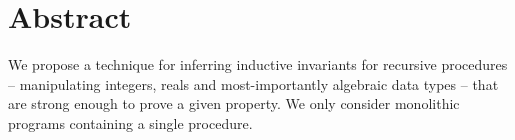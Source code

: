 \section{Abstract}

We propose a technique for inferring inductive invariants for recursive procedures --
manipulating integers, reals and most-importantly algebraic data types --
that are strong enough to prove a given property. 
We only consider monolithic programs containing a single procedure. 
 
